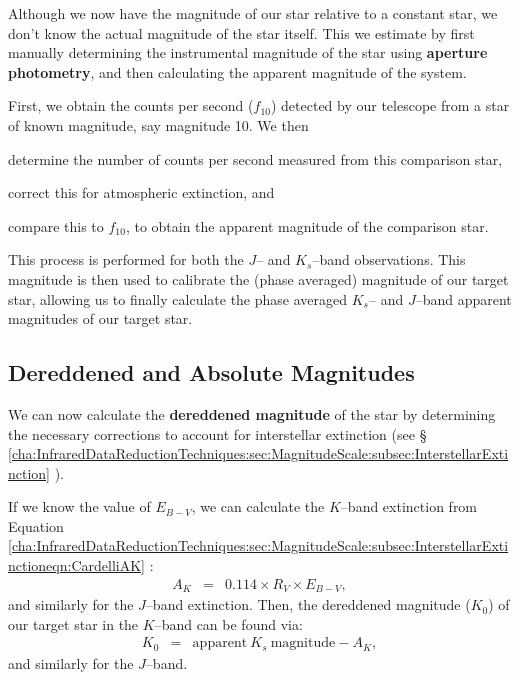 Although we now have the magnitude of our star relative to a constant
star, we don't know the actual magnitude of the star itself. This we
estimate by first manually determining the instrumental magnitude of the
star using \textbf{aperture photometry}, and then calculating the apparent magnitude of the system. %

\vspace{\myparskip}

First, we obtain the counts per second ($f_{10}$) detected by our
telescope from a star of known magnitude, say magnitude 10. We then
\begin{inparaenum}[(i)]
\item determine the number of counts per second measured from this comparison star,
\item correct this for atmospheric extinction, and
\item compare this to $f_{10}$, to obtain the apparent magnitude of the comparison star.
\end{inparaenum}

\vspace{\myparskip}

This process is performed for both the $J$-- and $K_{s}$--band observations. This magnitude is then used to calibrate the (phase averaged) magnitude of our target star, allowing us to finally calculate the phase averaged $K_{s}$-- and $J$--band apparent magnitudes of our target star. %


\subsection{Dereddened and Absolute Magnitudes}\label{cha:InfraredDataReductionTechniques:sec:Photometry:subsec:DereddenedMagnitude}

We can now calculate the \textbf{dereddened magnitude} of the star by
determining the necessary corrections to account for interstellar
extinction (see \S~%
\vref{cha:InfraredDataReductionTechniques:sec:MagnitudeScale:subsec:InterstellarExtinction}%
). %

\vspace{\myparskip}

If we know the value of $E_{B-V}$, we can calculate the $K$--band extinction from Equation~%
\vref{cha:InfraredDataReductionTechniques:sec:MagnitudeScale:subsec:InterstellarExtinctioneqn:CardelliAK}%
: %
\begin{eqnarray} \label{cha:InfraredDataReductionTechniques:sec:Photometry:subsec:DereddenedMagnitude:eqn:CardelliAK}
A_{K}    & = & 0.114 \times R_V \times E_{B-V}, \nonumber
\end{eqnarray}
and similarly for the $J$--band extinction. Then, the dereddened
magnitude ($K_{0}$) of our target star in the $K$--band can be found via:
\begin{eqnarray} \label{cha:InfraredDataReductionTechniques:sec:Photometry:subsec:DereddenedMagnitude:eqn:K0}
K_0 & = & \mathrm{apparent\ } K_{s} \mathrm{\ magnitude} - A_K,
\end{eqnarray}
and similarly for the $J$--band. %

